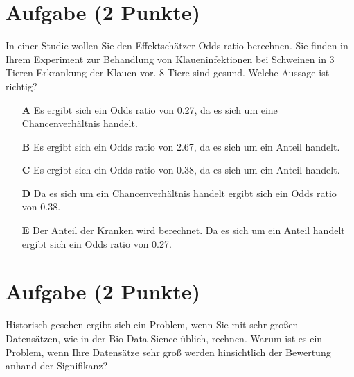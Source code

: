 \documentclass[a4paper, 9pt]{scrartcl}\usepackage[]{graphicx}\usepackage[]{xcolor}
\begin{document}
\section{Aufgabe \hfill (2 Punkte)}



In einer Studie wollen Sie den Effektschätzer Odds ratio berechnen. Sie finden in Ihrem Experiment zur Behandlung von Klaueninfektionen bei Schweinen in 3 Tieren Erkrankung der Klauen vor. 8 Tiere sind gesund. Welche Aussage ist richtig?



\begin{enumerate}
\item [\textbf{A} \msquare] Es ergibt sich ein Odds ratio von 0.27, da es sich um eine Chancenverhältnis handelt.
\item [\textbf{B} \msquare] Es ergibt sich ein Odds ratio von 2.67, da es sich um ein Anteil handelt.
\item [\textbf{C} \msquare] Es ergibt sich ein Odds ratio von 0.38, da es sich um ein Anteil handelt.
\item [\textbf{D} \msquare] Da es sich um ein Chancenverhältnis handelt ergibt sich ein Odds ratio von 0.38.
\item [\textbf{E} \msquare] Der Anteil der Kranken wird berechnet. Da es sich um ein Anteil handelt ergibt sich ein Odds ratio von 0.27.
\end{enumerate}

\section{Aufgabe \hfill (2 Punkte)}



Historisch gesehen ergibt sich ein Problem, wenn Sie mit sehr großen Datensätzen, wie in der Bio Data Sience üblich, rechnen. Warum ist es ein Problem, wenn Ihre Datensätze sehr groß werden hinsichtlich der Bewertung anhand der Signifikanz?
\end{document}
